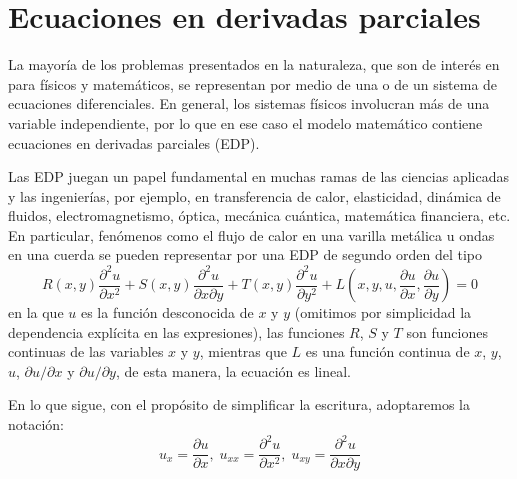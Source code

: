 

\chapter{Ecuaciones en derivadas parciales} \label{ch:parciales} 

La mayoría de los problemas presentados en la naturaleza, que son de interés en para físicos y matemáticos, se representan por medio de una o de un sistema de ecuaciones diferenciales. En general, los sistemas físicos involucran más de una variable independiente, por lo que en ese caso el modelo matemático contiene ecuaciones en derivadas parciales (EDP).

Las EDP juegan un papel fundamental en muchas ramas de las ciencias aplicadas y 
las ingenierías, por ejemplo, en transferencia de calor, elasticidad, dinámica de fluidos, electromagnetismo, óptica, mecánica cuántica, matemática financiera, etc. En particular, fenómenos como el flujo de calor en una varilla metálica u ondas en una cuerda se pueden representar por una EDP de segundo orden del tipo
\begin{equation} \label{eq:general}
 R(x,y) \frac{\partial^2 u}{\partial x^2} + S(x,y) \frac{\partial^2 u}{\partial x \partial y} + T(x,y) \frac{\partial^2 u}{\partial y^2} + L \left( x, y, u, \frac{\partial u}{\partial x}, \frac{\partial u}{\partial y} \right) = 0
\end{equation} 
en la que $u$ es la función desconocida de $x$ y $y$ (omitimos por simplicidad la dependencia explícita en las expresiones), las funciones $R$, $S$ y $T$ son funciones continuas de las variables $x$ y $y$, mientras que $L$ es una función continua de $x$, $y$, $u$, $\partial u / \partial x$ y $\partial u / \partial y$, de esta manera, la ecuación es lineal.

En lo que sigue, con el propósito de simplificar la escritura, adoptaremos la notación:
\[ u_x = \frac{\partial u}{\partial x}, \; u_{xx} = \frac{\partial^2 u}{\partial x^2}, \; u_{xy} = \frac{\partial^2 u}{\partial x \partial y} \]

